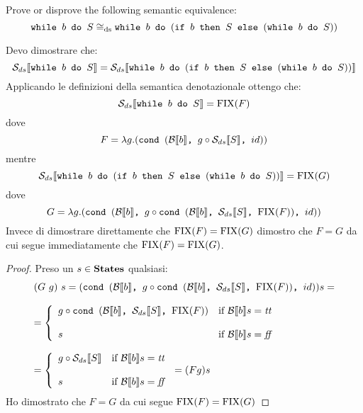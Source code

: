 {Prove or disprove the following semantic equivalence:
$$
\wbS{b}{S} \eqDS \wbS{b}{(\ifABC{b}{S}{(\wbS{b}{S})})}
$$	
}
{
Devo dimostrare che:
$$
\dsCtxt{\wbS{b}{S}} = \dsCtxt{\wbS{b}{(\ifABC{b}{S}{(\wbS{b}{S})})}}
$$	
Applicando le definizioni della semantica denotazionale ottengo che:
$$
\dsCtxt{\wbS{b}{S}} = \fixp{F}
$$
dove 
$$
F = \lambda g. (\cond{b}{g \circ \dsCtxt{S}}{id})
$$
mentre
$$
\dsCtxt{\wbS{b}{(\ifABC{b}{S}{(\wbS{b}{S})})}} = \fixp{G}
$$
dove
$$
G = \lambda g .(\cond{b}{g \circ \cond{b}{\dsCtxt{S}}{\fixp{F}}}{id})
$$
Invece di dimostrare direttamente che $\fixp{F} = \fixp{G}$ dimostro 
che $F = G$ da cui segue immediatamente che $\fixp{F} = \fixp{G}$.

\begin{proof}
Preso un $s \in \states$ qualsiasi:
$$
\begin{array}{l}
(G\ g)\ s = (\cond{b}{g \circ \cond{b}{\dsCtxt{S}}{\fixp{F}}}{id}) s =\\
\\
= \caseFun{g \circ \cond{b}{\dsCtxt{S}}{\fixp{F}}}{\B{b} = \semtrue}{s}{\B{b} = \semfalse} \\
\\
= \caseFun{g \circ \dsCtxt{S}}{\B{b} = \semtrue}{s}{\B{b} = \semfalse} = (F g) s
\end{array}
$$ 
Ho dimostrato che $F = G$ da cui segue $\fixp{F} = \fixp{G}$
\end{proof}
	
}
